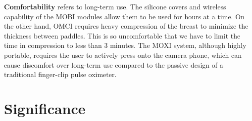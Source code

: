 \textbf{Comfortability} refers to long-term use. The silicone covers and wireless capability of the \ac{MOBI} modules allow them to be used for hours at a time. On the other hand, \ac{OMCI} requires heavy compression of the breast to minimize the thickness between paddles. This is so uncomfortable that we have to limit the time in compression to less than 3 minutes. The \ac{MOXI} system, although highly portable, requires the user to actively press onto the camera phone, which can cause discomfort over long-term use compared to the passive design of a traditional finger-clip pulse oximeter. 




\section{Significance}